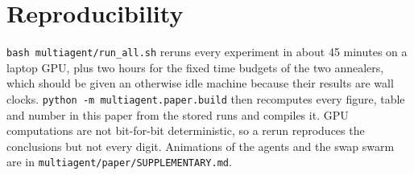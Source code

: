 \documentclass[10pt]{article}
\begin{document}
\section{Reproducibility}\label{app:repro}
\texttt{bash multiagent/run\_all.sh} reruns every experiment in about 45 minutes on a laptop GPU, plus two hours for the fixed time budgets of the two annealers, which should be given an otherwise idle machine because their results are wall clocks. \texttt{python -m multiagent.paper.build} then recomputes every figure, table and number in this paper from the stored runs and compiles it. GPU computations are not bit-for-bit deterministic, so a rerun reproduces the conclusions but not every digit. Animations of the agents and the swap swarm are in \texttt{multiagent/paper/SUPPLEMENTARY.md}.
\end{document}
